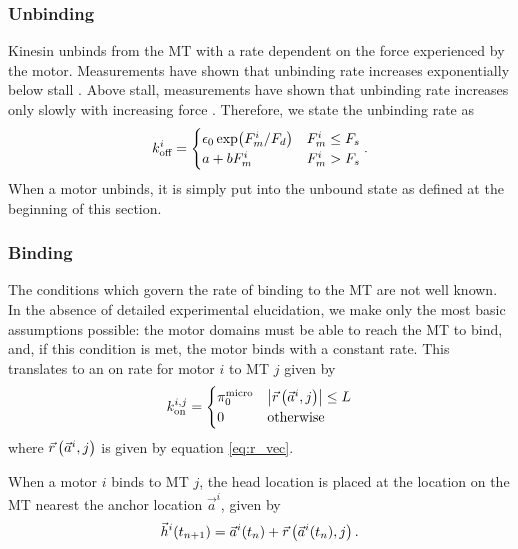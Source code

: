 \subsubsection*{Unbinding}

Kinesin unbinds from the MT with a rate dependent on the force experienced by the motor. Measurements have shown that unbinding rate increases exponentially below stall \cite{Milic2014}. Above stall, measurements have shown that unbinding rate increases only slowly with increasing force \cite{Kunwar2011}. Therefore, we state the unbinding rate as
\begin{equation} \label{eq:unbinding}
k_\text{off}^i = 
\begin{cases}
\epsilon_0 \exp(F_m^i/F_d) & F_m^i \leq F_s \\
a+b F_m^i & F_m^i>F_s
\end{cases}.
\end{equation}
When a motor unbinds, it is simply put into the unbound state as defined at the beginning of this section.

\subsubsection*{Binding}

The conditions which govern the rate of binding to the MT are not well known. In the absence of detailed experimental elucidation, we make only the most basic assumptions possible: the motor domains must be able to reach the MT to bind, and, if this condition is met, the motor binds with a constant rate. This translates to an on rate for motor $i$ to MT $j$ given by
\begin{equation} \label{eq:binding}
k_\text{on}^{i,j} = 
\begin{cases}
\pi_0^{\text{micro}} & \abs{ \vec{r} \left(\vec{a}^i , j \right) } \leq L\\
0 & \text{otherwise}
\end{cases}
\end{equation}
where $\vec{r} \left(\vec{a}^i , j \right)$ is given by equation \ref{eq:r_vec}.

When a motor $i$ binds to MT $j$, the head location is placed at the location on the MT nearest the anchor location $\vec{a}^i$, given by 
\begin{equation} \label{eq:bind_head}
\vec{h}^i(t_{n+1})=\vec{a}^i(t_n) + \vec{r} \left(\vec{a}^i(t_n) , j \right).
\end{equation}

